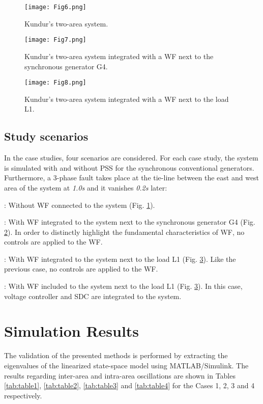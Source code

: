 \documentclass[conference,11pt]{IEEEtran}
\begin{document}
\begin{figure}[t]
  \centering
  \texttt{[image: Fig6.png]}
  \caption{Kundur's two-area system.}
  \label{f:fig6_label}
\end{figure}


\begin{figure}[t]
  \centering
  \texttt{[image: Fig7.png]}
  \caption{Kundur's two-area system integrated with a WF next to the synchronous generator G4.}
  \label{f:fig7_label}
\end{figure}


\begin{figure}[t]
  \centering
  \texttt{[image: Fig8.png]}
  \caption{Kundur's two-area system integrated with a WF next to the load L1.}
  \label{f:fig8_label}
\end{figure}


\subsection{Study scenarios}\label{ss:scenarios}

In the case studies, four scenarios are considered. For each case study, the system is simulated with and without PSS for the synchronous conventional generators. Furthermore, a 3-phase fault takes place at the tie-line between the east and west area of the system at \emph{1.0s} and it vanishes \emph{0.2s} later: 

: Without WF connected to the system (Fig. \ref{f:fig6_label}). 

: With WF integrated to the system next to the synchronous generator G4 (Fig. \ref{f:fig7_label}). In order to distinctly highlight the fundamental characteristics of WF, no controls are applied to the WF. 

: With WF integrated to the system next to the load L1 (Fig. \ref{f:fig8_label}). Like the previous case, no controls are applied to the WF.

: With WF included to the system next to the load L1 (Fig. \ref{f:fig8_label}). In this case, voltage controller and SDC are integrated to the system.


\section{Simulation Results}\label{s:results}
The validation of the presented methods is performed by extracting the eigenvalues of the linearized state-space model using MATLAB/Simulink. The results regarding inter-area and intra-area oscillations are shown in Tables \ref{tab:table1}, \ref{tab:table2}, \ref{tab:table3} and \ref{tab:table4} for the Cases 1, 2, 3 and 4 respectively.
\end{document}
